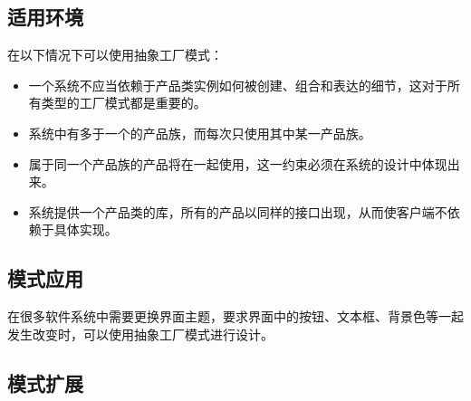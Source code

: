 \documentclass[letterpaper,10pt,english]{sphinxmanual}
\begin{document}
\subsection{适用环境}
\label{\detokenize{creational_patterns/abstract_factory:id11}}
\sphinxAtStartPar
在以下情况下可以使用抽象工厂模式：
\begin{itemize}
\item {} 
\sphinxAtStartPar
一个系统不应当依赖于产品类实例如何被创建、组合和表达的细节，这对于所有类型的工厂模式都是重要的。

\item {} 
\sphinxAtStartPar
系统中有多于一个的产品族，而每次只使用其中某一产品族。

\item {} 
\sphinxAtStartPar
属于同一个产品族的产品将在一起使用，这一约束必须在系统的设计中体现出来。

\item {} 
\sphinxAtStartPar
系统提供一个产品类的库，所有的产品以同样的接口出现，从而使客户端不依赖于具体实现。

\end{itemize}


\subsection{模式应用}
\label{\detokenize{creational_patterns/abstract_factory:id12}}
\sphinxAtStartPar
在很多软件系统中需要更换界面主题，要求界面中的按钮、文本框、背景色等一起发生改变时，可以使用抽象工厂模式进行设计。


\subsection{模式扩展}
\label{\detokenize{creational_patterns/abstract_factory:id13}}
\end{document}

